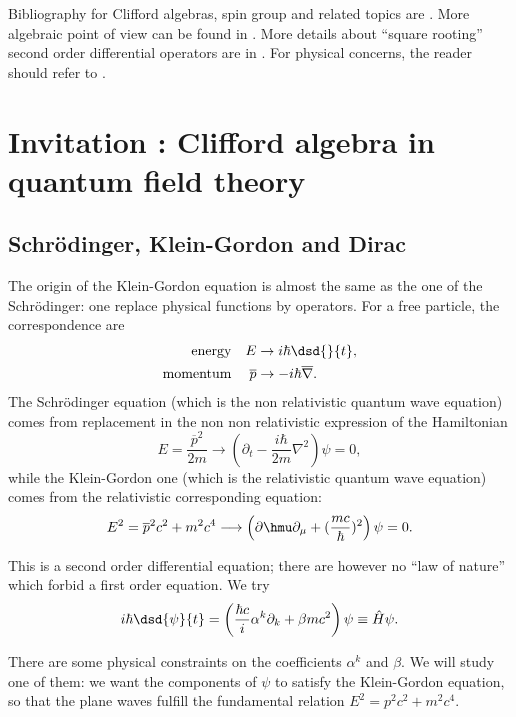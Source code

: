 Bibliography for Clifford algebras, spin group and related topics are \cite{memP,Michelson,Witkowski,mellor,ResEtaDiracType}. More algebraic point of view  can be found in \cite{Fult,Chevalley}. More details about ``square rooting'' second order differential operators are in \cite{Bronn}. For physical concerns, the reader should refer to \cite{Weinberg,Peskin,schwabl}. 

\section{Invitation : Clifford algebra in quantum field theory}

\label{Secqft}
\subsection{Schrödinger, Klein-Gordon and Dirac}

The origin of the Klein-Gordon equation is almost the same as the one of the Schrödinger: one replace physical functions by operators. For a free particle, the correspondence are
\begin{align*}
 \textrm{energy}&& E&\rightarrow i\hbar\dsd{}{t},\\
 \textrm{momentum}&& \overline{p}&\rightarrow -i\hbar\overline{ \nabla }.
\end{align*}
The Schrödinger equation (which is the non relativistic quantum wave equation) comes from replacement in the non non relativistic expression of the Hamiltonian
\[
E=\frac{\overline{p}^2}{2m}\longrightarrow\left(\partial_t-\frac{i\hbar}{2m}\nabla^2\right)\psi=0,
\]
while the Klein-Gordon one (which is the relativistic quantum wave equation) comes from the relativistic corresponding equation:
\[
E^2=\overline{p}^2c^2+m^2c^4\longrightarrow\left(\partial\hmu\partial_{\mu}+(\frac{mc}{\hbar})^2\right)\psi=0.
\]

This is a second order differential equation; there are however no ``law of nature''{} which forbid a first order equation. We try
\[
 i\hbar\dsd{\psi}{t}
 =\left(\frac{\hbar c}{i}\alpha^k\partial_k+\beta mc^2\right)\psi\equiv \hat{H}\psi.
\]

There are some physical constraints on the coefficients $\alpha^k$ and $\beta$. We will study one of them: we want the components of $\psi$ to satisfy the Klein-Gordon equation, so that the plane waves fulfill the fundamental relation $E^2=p^2c^2+m^2c^4$.

